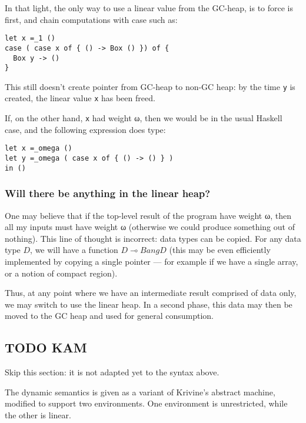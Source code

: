 \documentclass[11pt]{article}
\begin{document}
In that light, the only way to use a linear value from the GC-heap, is
to force is first, and chain computations with case such as:
\begin{verbatim}
let x =_1 ()
case ( case x of { () -> Box () }) of {
  Box y -> ()
}
\end{verbatim}
This still doesn't create pointer from GC-heap to non-GC heap: by the
time \verb|y| is created, the linear value \verb|x| has been freed.

If, on the other hand, \verb|x| had weight ω, then we would be in the
usual Haskell case, and the following expression does type:
\begin{verbatim}
let x =_omega ()
let y =_omega ( case x of { () -> () } )
in ()
\end{verbatim}

\subsubsection{Will there be anything in the linear heap?}

One may believe that if the top-level result of the program have
weight ω, then all my inputs must have weight ω (otherwise we could
produce something out of nothing). This line of thought is incorrect:
data types can be copied. For any data type $D$, we will have a
function $D ⊸ Bang D$ (this may be even efficiently implemented by
copying a single pointer --- for example if we have a single array, or
a notion of compact region).

Thus, at any point where we have an intermediate result comprised of
data only, we may switch to use the linear heap. In a second phase,
this data may then be moved to the GC heap and used for general
consumption.


\subsection{{\bfseries\sffamily TODO} KAM}
\label{sec:orgheadline14}

Skip this section: it is not adapted yet to the syntax above.

The dynamic semantics is given as a variant of Krivine's abstract
machine, modified to support two environments. One environment is
unrestricted, while the other is linear.
\end{document}
